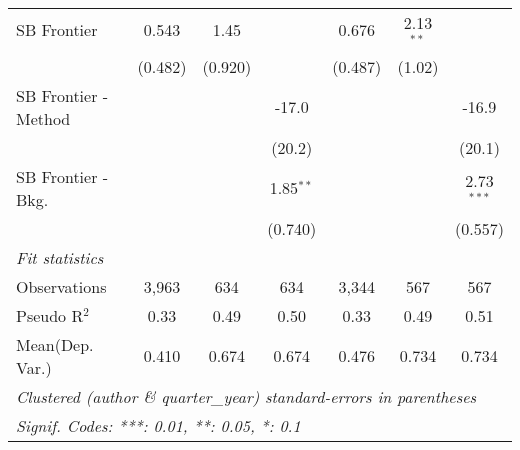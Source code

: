\begin{tabular}{lcccccc}
   SB Frontier          & 0.543   & 1.45    &               & 0.676   & 2.13$^{**}$ &   \\   
                        & (0.482) & (0.920) &               & (0.487) & (1.02)      &   \\   
   SB Frontier - Method &         &         & -17.0         &         &             & -16.9\\   
                        &         &         & (20.2)        &         &             & (20.1)\\   
   SB Frontier - Bkg.   &         &         & 1.85$^{**}$   &         &             & 2.73$^{***}$\\   
                        &         &         & (0.740)       &         &             & (0.557)\\   
   \midrule
   \emph{Fit statistics}\\
   Observations         & 3,963   & 634     & 634           & 3,344   & 567         & 567\\  
   Pseudo R$^2$         & 0.33    & 0.49    & 0.50          & 0.33    & 0.49        & 0.51\\  
Mean(Dep. Var.) & 0.410 & 0.674 & 0.674 & 0.476 & 0.734 & 0.734 \\
   \midrule \midrule
   \multicolumn{7}{l}{\emph{Clustered (author \& quarter\_year) standard-errors in parentheses}}\\
   \multicolumn{7}{l}{\emph{Signif. Codes: ***: 0.01, **: 0.05, *: 0.1}}\\
\end{tabular}
\par\endgroup
